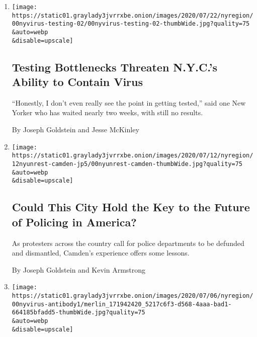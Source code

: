 \begin{enumerate}
\def\labelenumi{\arabic{enumi}.}
\item
  \href{/2020/07/23/nyregion/coronavirus-testing-nyc.html}{}

  \texttt{[image: https://static01.graylady3jvrrxbe.onion/images/2020/07/22/nyregion/00nyvirus-testing-02/00nyvirus-testing-02-thumbWide.jpg?quality=75\\\&auto=webp\\\&disable=upscale]}

  \hypertarget{testing-bottlenecks-threaten-nycs-ability-to-contain-virus}{%
  \subsection{Testing Bottlenecks Threaten N.Y.C.'s Ability to Contain
  Virus}\label{testing-bottlenecks-threaten-nycs-ability-to-contain-virus}}

  ``Honestly, I don't even really see the point in getting tested,''
  said one New Yorker who has waited nearly two weeks, with still no
  results.

  By Joseph Goldstein and Jesse McKinley
\item
  \href{/2020/07/12/nyregion/camden-police.html}{}

  \texttt{[image: https://static01.graylady3jvrrxbe.onion/images/2020/07/12/nyregion/12nyunrest-camden-jp5/00nyunrest-camden-thumbWide.jpg?quality=75\\\&auto=webp\\\&disable=upscale]}

  \hypertarget{could-this-city-hold-the-key-to-the-future-of-policing-in-america}{%
  \subsection{Could This City Hold the Key to the Future of Policing in
  America?}\label{could-this-city-hold-the-key-to-the-future-of-policing-in-america}}

  As protesters across the country call for police departments to be
  defunded and dismantled, Camden's experience offers some lessons.

  By Joseph Goldstein and Kevin Armstrong
\item
  \href{/2020/07/09/nyregion/nyc-coronavirus-antibodies.html}{}

  \texttt{[image: https://static01.graylady3jvrrxbe.onion/images/2020/07/06/nyregion/00nyvirus-antibody1/merlin\_171942420\_5217c6f3-d568-4aaa-bad1-664185bfadd5-thumbWide.jpg?quality=75\\\&auto=webp\\\&disable=upscale]}

  \hypertarget{68-have-antibodies-in-this-clinic-can-a-neighborhood-beat-a-next-wave}{%
}
\end{enumerate}
